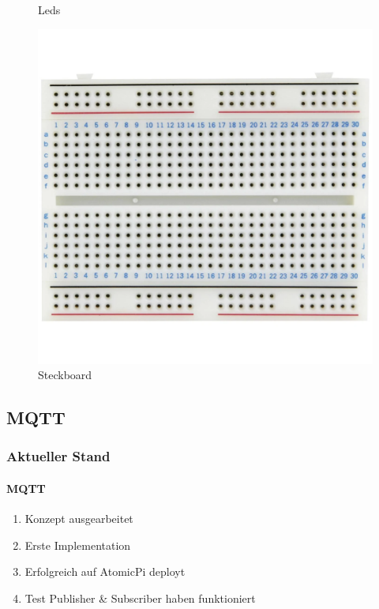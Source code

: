 \documentclass[]{beamer}
\begin{document}
\begin{frame}
\begin{figure}
\begin{minipage}{0.32\textwidth}
			\caption{Leds}
		\end{minipage}\hfill
		\begin{minipage}{0.32\textwidth}
			\centering
			\includegraphics[width=\textwidth]{Images/Steckbrett.png}
			\caption{Steckboard}
		\end{minipage}
	\end{figure}
	
\end{frame}

\subsection{MQTT}
\begin{frame}
	\frametitle{Aktueller Stand}
	\framesubtitle{MQTT}
	\begin{enumerate}
		\item Konzept ausgearbeitet
		\item Erste Implementation
		\item Erfolgreich auf AtomicPi deployt
		\item Test Publisher \& Subscriber haben funktioniert
	\end{enumerate}
\end{frame}
\end{document}
